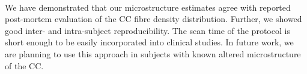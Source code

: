 \paragraph{}
We have demonstrated that our microstructure estimates agree with reported post-mortem evaluation of the CC fibre density distribution. Further, we showed good inter- and intra-subject reproducibility. The scan time of the protocol is short enough to be easily incorporated into clinical studies. In future work, we are planning to use this approach in subjects with known altered microstructure of the CC.